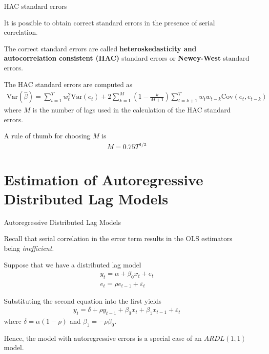 \documentclass[10pt,aspectratio=169]{beamer}  %
\begin{document}

\begin{frame}{HAC standard errors}

    \bigskip
    It is possible to obtain correct standard errors in the presence of serial correlation.

    \medskip
    The correct standard errors are called \textbf{heteroskedasticity and autocorrelation consistent (HAC)} standard errors or \textbf{Newey-West} standard errors.

    \medskip
    The HAC standard errors are computed as
    \begin{align*}
        \mathrm{Var}(\widehat{\beta}) = \sum_{t=1}^{T} w_{t}^2 \mathrm{Var}(e_{t}) + 2 \sum_{k=1}^{M} \left( 1 - \frac{k}{M+1} \right) \sum_{t=k+1}^{T} w_{t} w_{t-k} \mathrm{Cov}(e_{t}, e_{t-k})
    \end{align*}
    where $ M $ is the number of lags used in the calculation of the HAC standard errors.

    \medskip
    A rule of thumb for choosing $ M $ is
    \begin{align*}
        M = 0.75 T^{1/3}
    \end{align*}

\end{frame}


\section{Estimation of Autoregressive Distributed Lag Models}


\begin{frame}{Autoregressive Distributed Lag Models}

    \bigskip
    Recall that serial correlation in the error term results in the OLS estimators being \textit{inefficient}.

    \medskip
    Suppose that we have a distributed lag model
    \begin{align*}
        y_{t} = \alpha + \beta_{0} x_{t} + e_{t} \\
        e_{t} = \rho e_{t-1} + \varepsilon_{t}
    \end{align*}

    Substituting the second equation into the first yields
    \begin{align*}
        y_{t} = \delta + \rho y_{t-1} + \beta_{0} x_{t} + \beta_{1} x_{t-1} + \varepsilon_{t}
    \end{align*}
    where $ \delta = \alpha \left( 1-\rho \right) $ and $ \beta_{1} = - \rho \beta_{0} $.

    \medskip
    Hence, the model with autoregressive errors is a special case of an $ ARDL(1, 1) $ model.

\end{frame}
\end{document}

